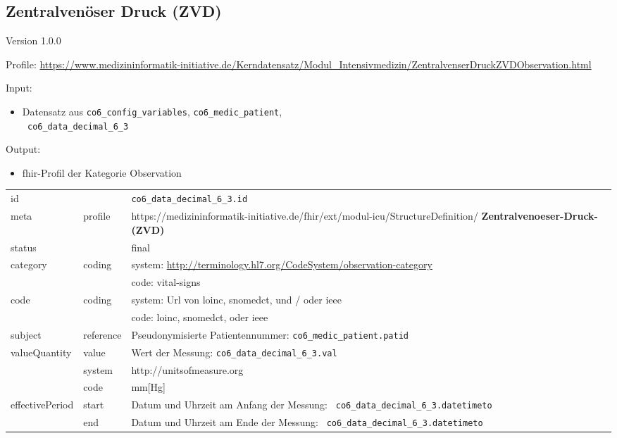 \subsection{Zentralvenöser Druck (ZVD)} 
\noindent Version 1.0.0

\noindent Profile: \url{https://www.medizininformatik-initiative.de/Kerndatensatz/Modul_Intensivmedizin/ZentralvenserDruckZVDObservation.html}

\noindent Input:
\begin{itemize}
	\item Datensatz aus \texttt{co6\_config\_variables}, \texttt{co6\_medic\_patient}, \\ \texttt{
co6\_data\_decimal\_6\_3}
\end{itemize}
Output:
\begin{itemize}
        \item \ac{fhir}-Profil der Kategorie \glqq Observation\grqq{}
\end{itemize}
\begin{longtable}{|l|l|p{7.5cm}|}
        \hline
        \rowcolor{lightgray} \multicolumn{3}{|l|}{Data Mapping (inhaltlich)} \\ \hline
        id &  & \texttt{co6\_data\_decimal\_6\_3.id} \\ \hline
	meta & profile & https://medizininformatik-initiative.de/fhir/ext/modul-icu/StructureDefinition/\textbf{
Zentralvenoeser-Druck-(ZVD)} \\ \hline 
	status &  & final  \\ \hline 
	category & coding & system: \url{http://terminology.hl7.org/CodeSystem/observation-category} \\
\cline{3-3}
	& & code: vital-signs \\ \hline
	code & coding & system: Url von \ac{loinc}, \ac{snomedct}, und / oder \ac{ieee} \\ 
	\cline{3-3} 
	 &  & code: \ac{loinc}, \ac{snomedct}, oder \ac{ieee} \\ \hline
	subject & reference & Pseudonymisierte Patientennummer: \texttt{co6\_medic\_patient.patid} \\ \hline
	valueQuantity & value & Wert der Messung: \texttt{co6\_data\_decimal\_6\_3.val} \\
        \cline{2-3}
         & system & http://unitsofmeasure.org \\
         \cline{2-3}
         & code & mm[Hg] \\ \hline
    effectivePeriod & start & Datum und Uhrzeit am Anfang der Messung: \texttt{
co6\_data\_decimal\_6\_3.datetimeto} \\
    \cline{2-3}
     & end & Datum und Uhrzeit am Ende der Messung: \texttt{
co6\_data\_decimal\_6\_3.datetimeto} \\ \hline
\end{longtable}
